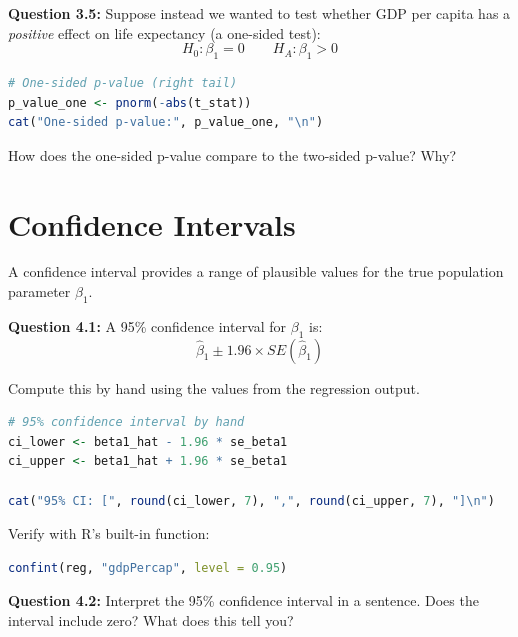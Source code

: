 \documentclass[11pt,letterpaper]{article}
\begin{document}
\vspace{2cm}

\textbf{Question 3.5:} Suppose instead we wanted to test whether GDP per capita has a \textit{positive} effect on life expectancy (a one-sided test):
\[
H_0: \beta_1 = 0 \qquad H_A: \beta_1 > 0
\]

\begin{lstlisting}[language=R]
# One-sided p-value (right tail)
p_value_one <- pnorm(-abs(t_stat))
cat("One-sided p-value:", p_value_one, "\n")
\end{lstlisting}

How does the one-sided p-value compare to the two-sided p-value? Why?

\vspace{2cm}

\newpage

\section{Confidence Intervals}

A confidence interval provides a range of plausible values for the true population parameter $\beta_1$.

\textbf{Question 4.1:} A 95\% confidence interval for $\beta_1$ is:
\[
\hat{\beta}_1 \pm 1.96 \times SE(\hat{\beta}_1)
\]

Compute this by hand using the values from the regression output.

\begin{lstlisting}[language=R]
# 95% confidence interval by hand
ci_lower <- beta1_hat - 1.96 * se_beta1
ci_upper <- beta1_hat + 1.96 * se_beta1

cat("95% CI: [", round(ci_lower, 7), ",", round(ci_upper, 7), "]\n")
\end{lstlisting}

\vspace{0.5cm}

Verify with R's built-in function:

\begin{lstlisting}[language=R]
confint(reg, "gdpPercap", level = 0.95)
\end{lstlisting}

\vspace{1cm}

\textbf{Question 4.2:} Interpret the 95\% confidence interval in a sentence. Does the interval include zero? What does this tell you?
\end{document}
